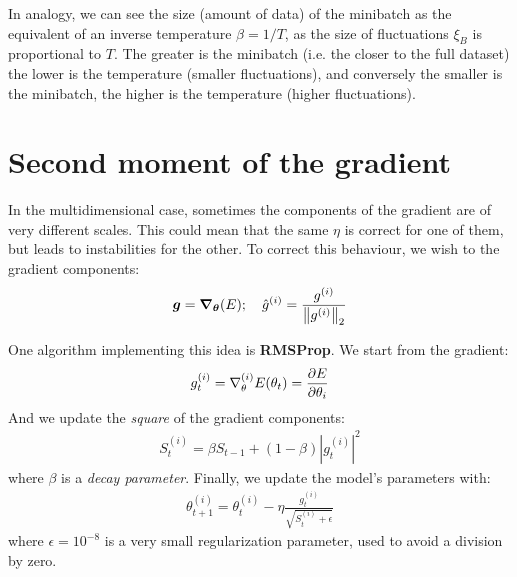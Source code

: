 \documentclass[../template.tex]{subfiles}
\begin{document}
\medskip

In analogy, we can see the size (amount of data) of the minibatch as the equivalent of an inverse temperature $\beta = 1/T$, as the size of fluctuations $\xi_B$ is proportional to $T$. The greater is the minibatch (i.e. the closer to the full dataset) the lower is the temperature (smaller fluctuations), and conversely the smaller is the minibatch, the higher is the temperature (higher fluctuations).

\section{Second moment of the gradient}
In the multidimensional case, sometimes the components of the gradient are of very different scales. This could mean that the same $\eta$ is correct for one of them, but leads to instabilities for the other. To correct this behaviour, we wish to  the gradient components:
\begin{align*}
    \bm{g} = \grad_{\bm{\theta}}(E); \quad \hat{g}^{(i)} =\frac{g^{(i)}}{\norm{g^{(i)}}_2} 
\end{align*}

One algorithm implementing this idea is \textbf{RMSProp}. We start from the gradient:
\begin{align*}
    g_t^{(i)} = \nabla_{\theta}^{(i)} E(\theta_t) = \pdv{E}{\theta_i} (\theta_t)
\end{align*} 
And we update the \textit{square} of the gradient components: 
\begin{align*}
    S_t^{(i)} = \beta S_{t-1} + (1-\beta) |g^{(i)}_t|^2
\end{align*}
where $\beta$ is a \textit{decay parameter}. Finally, we update the model's parameters with:
\begin{align*}
    \theta_{t+1}^{(i)} = \theta_t^{(i)} - \eta \frac{g_t^{(i)}}{\sqrt{S_t^{(i)}+\epsilon}} 
\end{align*} 
where $\epsilon = 10^{-8}$ is a very small regularization parameter, used to avoid a division by zero.

\medskip
\end{document}
